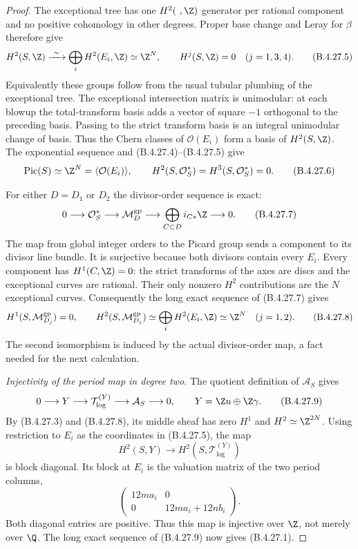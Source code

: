 \begin{proof}
The exceptional tree has one $H^2(\ ,\Z)$
generator per rational component and no positive
cohomology in other degrees. Proper base change
and Leray for $\beta$ therefore give
\[
 H^2(S,\Z)\xrightarrow{\ \sim\ }
       \bigoplus_i H^2(E_i,\Z)\simeq\Z^N,
 \qquad H^j(S,\Z)=0\quad(j=1,3,4).
 \tag{B.4.27.5}
\]
Equivalently these groups follow from the usual
tubular plumbing of the exceptional tree.
The exceptional intersection matrix is
unimodular: at each blowup the total-transform
basis adds a vector of square $-1$ orthogonal
to the preceding basis. Passing to the strict
transform basis is an integral unimodular
change of basis. Thus the Chern classes of
$\mathcal O(E_i)$ form a basis of
$H^2(S,\Z)$. The exponential sequence and
(B.4.27.4)--(B.4.27.5) give
\[
 \operatorname{Pic}(S)\simeq\Z^N
       =\langle\mathcal O(E_i)\rangle,
 \qquad
 H^2(S,\mathcal O_S^*)=H^3(S,\mathcal O_S^*)=0.
 \tag{B.4.27.6}
\]

For either $D=D_1$ or $D_2$ the divisor-order
sequence is exact:
\[
 0\longrightarrow\mathcal O_S^*
 \longrightarrow\mathcal M_D^{\mathrm{gp}}
 \longrightarrow
   \bigoplus_{C\subset D}i_{C*}\Z
 \longrightarrow0.
 \tag{B.4.27.7}
\]
The map from global integer orders to the Picard
group sends a component to its divisor line
bundle. It is surjective because both divisors
contain every $E_i$. Every component has
$H^1(C,\Z)=0$: the strict transforms of the
axes are discs and the exceptional curves are
rational. Their only nonzero $H^2$ contributions
are the $N$ exceptional curves. Consequently
the long exact sequence of (B.4.27.7) gives
\[
 H^1(S,\mathcal M_{D_j}^{\mathrm{gp}})=0,
 \qquad
 H^2(S,\mathcal M_{D_j}^{\mathrm{gp}})
       \simeq\bigoplus_i H^2(E_i,\Z)
       \simeq\Z^N\quad(j=1,2).
 \tag{B.4.27.8}
\]
The second isomorphism is induced by the actual
divisor-order map, a fact needed for the next
calculation.

\emph{Injectivity of the period map in degree two.}
The quotient definition of $\mathcal A_S$ gives
\[
 0\longrightarrow Y\longrightarrow
 \mathcal T_{\log}^{(Y)}\longrightarrow
 \mathcal A_S\longrightarrow0,
 \qquad Y=\Z u\oplus\Z\gamma.
 \tag{B.4.27.9}
\]
By (B.4.27.3) and (B.4.27.8), its middle
sheaf has zero $H^1$ and $H^2\simeq\Z^{2N}$.
Using restriction to $E_i$ as the coordinates
in (B.4.27.5), the map
\[
 H^2(S,Y)\longrightarrow
 H^2(S,\mathcal T_{\log}^{(Y)})
\]
is block diagonal. Its block at $E_i$ is the
valuation matrix of the two period columns,
\[
 \begin{pmatrix}
 12m a_i&0\\0&12m a_i+12n b_i
 \end{pmatrix}.
 \tag{B.4.27.10}
\]
Both diagonal entries are positive. Thus this
map is injective over $\Z$, not merely over
$\Q$. The long exact sequence of
(B.4.27.9) now gives (B.4.27.1).


\end{proof}
